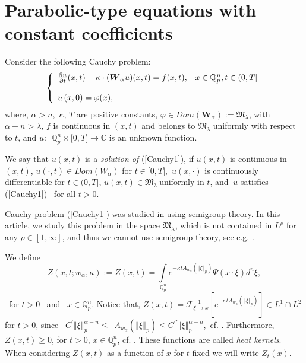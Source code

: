 \documentclass{amsart}\usepackage{amsfonts}
\theoremstyle{plain}
\numberwithin{equation}{section}
\begin{document}
\section{\label{Sect3}Parabolic-type equations with constant coefficients}

Consider the following Cauchy problem:\begin{equation}
\left\{
\begin{array}
[c]{ll}\frac{\partial u}{\partial t}(x,t)-\kappa\cdot(\boldsymbol{W}_{\alpha
}u)(x,t)=f(x,t), & x\in\mathbb{Q}_{p}^{n},t\in(0,T]\\
& \\
u\left(  x,0\right)  =\varphi(x), &
\end{array}
\right.  \label{Cauchy1}\end{equation}
where, $\alpha>n,$ $\kappa$, $T$ are positive constants, $\varphi\in
Dom(\boldsymbol{W}_{\alpha}):=\mathcal{\mathfrak{M}}_{\lambda}$, with
$\alpha-n>\lambda$, $f$ is continuous in $(x,t)$ and belongs to
$\mathcal{\mathfrak{M}}_{\lambda}$ uniformly with respect to $t$, and
$u:$\ $\mathbb{Q}_{p}^{n}\times\lbrack0,T]\rightarrow\mathbb{C}$ is an unknown function.\ 

We say that $u(x,t)$ is a \textit{solution of }(\ref{Cauchy1}), if $u(x,t)$ is
continuous in $(x,t)$, $u(\cdot,t)\in Dom(W_{\alpha})$ for $t\in\lbrack0,T],$
$u(x,\cdot)$ is continuously differentiable for $t\in(0,T]$, $u(x,t)\in
\mathcal{\mathfrak{M}}_{\lambda}\ $uniformly in $t$, and $\ u$ satisfies
(\ref{Cauchy1}) \ for all $t>0.$

Cauchy problem (\ref{Cauchy1}) was studied in \cite{Ch-Z} using semigroup
theory. In this article, we study this problem in the space
$\mathcal{\mathfrak{M}}_{\lambda}$, which is not contained in $L^{\rho}$ for
any $\rho\in\left[  1,\infty\right]  $, and thus we cannot use semigroup
theory, see e.g. \cite[Theorem 6.5]{Ch-Z}.

We define
\begin{equation}
Z(x,t;w_{\alpha},\kappa):=Z(x,t)=\underset{\mathbb{Q}_{p}^{n}}{\int}e^{-\kappa
tA_{w_{\alpha}}(\left\Vert \xi\right\Vert _{p})}\Psi(x\cdot\xi)d^{n}\xi,
\label{Z}\end{equation}
\ for $t>0$ \ and \ $x\in\mathbb{Q}_{p}^{n}$. Notice that, $Z(x,t)=\mathcal{F}_{\xi\rightarrow x}^{-1}[e^{-\kappa tA_{w_{\alpha}}(\left\Vert \xi\right\Vert
_{p})}]\in L^{1}\cap L^{2}$ for $t>0$, since \ $C^{\prime}\left\Vert
\xi\right\Vert _{p}^{\alpha-n}\leq$\ $A_{w_{\alpha}}(\left\Vert \xi\right\Vert
_{p})\leq C^{\prime\prime}\left\Vert \xi\right\Vert _{p}^{\alpha-n}$,\ cf.
\cite[Lemma 3.4]{Ch-Z}. Furthermore, $Z(x,t)\geq0$, for $t>0$, $x\in
\mathbb{Q}_{p}^{n}$, cf. \cite[Theorem 4.3 (i)]{Ch-Z}. These functions are
called \textit{heat kernels}. When considering $Z(x,t)$ as a function of $x$
for $t$ fixed we will write $Z_{t}(x)$.
\end{document}
